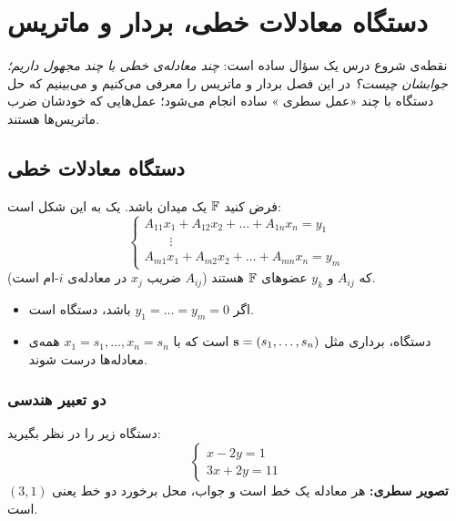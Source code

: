 \chapter{دستگاه معادلات خطی، بردار و ماتریس}
\label{ch:linear-equations}

نقطه‌ی شروع درس یک سؤال ساده است: \emph{چند معادله‌ی خطی با چند مجهول داریم؛ جوابشان چیست؟} در این فصل بردار و ماتریس را معرفی می‌کنیم و می‌بینیم که حل دستگاه با چند «عمل سطری » ساده انجام می‌شود؛ عمل‌هایی که خودشان ضرب ماتریس‌ها هستند.

\section{دستگاه معادلات خطی}

\begin{definition}
فرض کنید $\mathbb{F}$ یک میدان  باشد. یک  به این شکل است:
\[
\begin{cases}
A_{11}x_1+A_{12}x_2+\dots+A_{1n}x_n=y_1\\
\qquad\vdots\\
A_{m1}x_1+A_{m2}x_2+\dots+A_{mn}x_n=y_m
\end{cases}
\]
که $A_{ij}$ و $y_k$ عضوهای $\mathbb{F}$ هستند ($A_{ij}$ ضریب $x_j$ در معادله‌ی $i$-ام است).
\begin{itemize}
  \item اگر $y_1=\dots=y_m=0$ باشد، دستگاه  است.
  \item {} دستگاه، برداری مثل $\mathbf{s}=(s_1,\dots,s_n)$ است که با $x_1=s_1,\dots,x_n=s_n$ همه‌ی معادله‌ها درست شوند.
\end{itemize}
\end{definition}

\subsection{دو تعبیر هندسی}
دستگاه زیر را در نظر بگیرید:
\[
\begin{cases}
x-2y=1\\
3x+2y=11
\end{cases}
\]
\textbf{تصویر سطری:} هر معادله یک خط است و جواب، محل برخورد دو خط یعنی $(3,1)$ است.

\begin{center}
\end{center}

